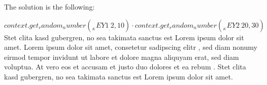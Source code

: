The solution is the following:
\begin{Solution}
\solitem ${{context.get_random_number(__KEY1__, 2, 10)}} \cdot {{context.get_random_number(__KEY2__, 20, 30)}}$
\solitem Stet clita kasd gubergren, no sea takimata sanctus est Lorem ipsum dolor sit amet. Lorem ipsum dolor sit amet, consetetur sadipscing elitr , sed diam nonumy eirmod tempor invidunt ut labore et dolore magna aliquyam erat, sed diam voluptua. 
\solitem At vero eos et accusam et justo duo dolores et ea rebum . Stet clita kasd gubergren, no sea takimata sanctus est Lorem ipsum dolor sit amet. 
\end{Solution}